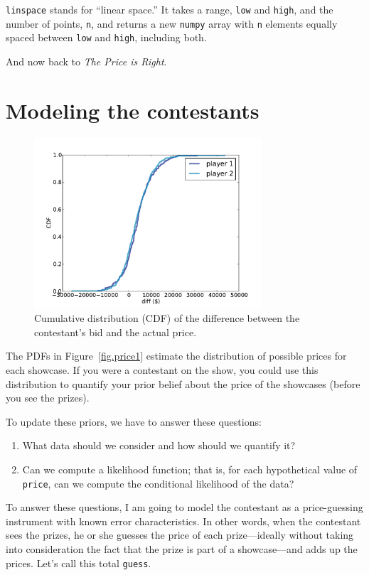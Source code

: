 \documentclass[12pt]{book}
\begin{document}
{\tt linspace} stands for
``linear space.''  It takes a range, {\tt low} and {\tt high}, and
the number of points, {\tt n}, and returns a new {\tt numpy}
array with {\tt n} elements equally spaced between {\tt low} and
{\tt high}, including both.

And now back to {\it The Price is Right}.


\section{Modeling the contestants}

\begin{figure}
\centerline{\includegraphics[height=2.5in]{figs/price2.pdf}}
\caption{Cumulative distribution (CDF) of the difference between the
  contestant's bid and the actual price.}
\label{fig.price2}
\end{figure}

The PDFs in Figure~\ref{fig.price1} estimate the distribution of
possible prices for each showcase.  If you were a contestant on the
show, you could use this distribution to quantify your prior belief
about the price of the showcases (before you see the prizes).

To update these priors, we have to answer these questions:

\begin{enumerate}

\item What data should we consider and how should we quantify it?

\item Can we compute a likelihood function; that is,
  for each hypothetical value of {\tt price}, can we compute
  the conditional likelihood of the data?

\end{enumerate}

To answer these questions, I am going to model the contestant
as a price-guessing instrument with known error characteristics.
In other words, when the contestant sees the prizes, he or she
guesses the price of each prize---ideally without taking into
consideration the fact that the prize is part of a showcase---and
adds up the prices.  Let's call this total {\tt guess}.
\end{document}
